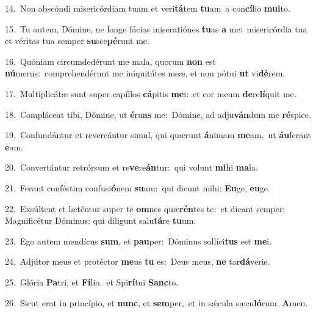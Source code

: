 {\numbfont\textcolor{\numbcolor}{14.}}~Non abscóndi misericórdiam tuam et veri\-\textbf{tá}\-tem \textbf{tu}\-am~\star a con\-\textbf{cí}\-lio \textbf{mul}\-to.\par
{\numbfont\textcolor{\numbcolor}{15.}}~Tu autem, Dómine, ne longe fácias miseratiónes \textbf{tu}\-as \textbf{a} me:~\star misericórdia tua et véritas tua semper \textbf{su}\-sce\-\textbf{pé}\-runt me.\par
{\numbfont\textcolor{\numbcolor}{16.}}~Quóniam circumdedérunt me mala, quorum \textbf{non} est \textbf{nú}\-merus:~\star comprehendérunt me iniquitátes meæ, et non pótui \textbf{ut} vi\-\textbf{dé}\-rem.\par
{\numbfont\textcolor{\numbcolor}{17.}}~Multiplicátæ sunt super capíllos \textbf{cá}\-pitis \textbf{me}\-i:~\star et cor meum \textbf{de}\-re\-\textbf{lí}\-quit me.\par
{\numbfont\textcolor{\numbcolor}{18.}}~Compláceat tibi, Dómine, ut \textbf{é}\-ru\textbf{as} me:~\star Dómine, ad adju\-\textbf{ván}\-dum me \textbf{ré}\-spice.\par
{\numbfont\textcolor{\numbcolor}{19.}}~Confundántur et revereántur simul, qui quærunt \textbf{á}\-nimam \textbf{me}\-am,~\star ut \textbf{áu}\-ferant \textbf{e}\-am.\par
{\numbfont\textcolor{\numbcolor}{20.}}~Convertántur retrórsum et re\-\textbf{ve}\-re\-\textbf{án}\-tur:~\star qui volunt \textbf{mi}\-hi \textbf{ma}\-la.\par
{\numbfont\textcolor{\numbcolor}{21.}}~Ferant conféstim confusi\-\textbf{ó}\-nem \textbf{su}\-am:~\star qui dicunt mihi: \textbf{Eu}\-ge, \textbf{eu}\-ge.\par
{\numbfont\textcolor{\numbcolor}{22.}}~Exsúltent et læténtur super te \textbf{om}\-nes quæ\-\textbf{rén}\-tes te:~\star et dicant semper: Magnificétur Dóminus: qui díligunt salu\-\textbf{tá}\-re \textbf{tu}\-um.\par
{\numbfont\textcolor{\numbcolor}{23.}}~Ego autem mendícus \textbf{sum}\-, et \textbf{pau}\-per:~\star Dóminus sollíci\textbf{tus} est \textbf{me}\-i.\par
{\numbfont\textcolor{\numbcolor}{24.}}~Adjútor meus et protéctor \textbf{me}\-us \textbf{tu} es:~\star Deus meus, \textbf{ne} tar\-\textbf{dá}\-veris.\par
{\numbfont\textcolor{\numbcolor}{25.}}~Glória \textbf{Pa}\-tri, et \textbf{Fí}\-lio,~\star et Spi\-\textbf{rí}\-tui \textbf{Sanc}\-to.\par
{\numbfont\textcolor{\numbcolor}{26.}}~Sicut erat in princípio, et \textbf{nunc}\-, et \textbf{sem}\-per,~\star et in sǽcula sæcu\-\textbf{ló}\-rum. \textbf{A}\-men.\par
